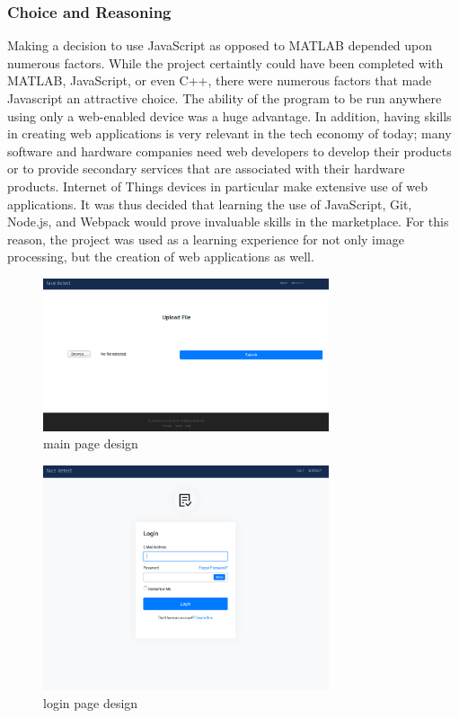 \documentclass{article}
\let\Oldsubsubsection\subsubsection
\renewcommand{\subsubsection}{\FloatBarrier\Oldsubsubsection}
\begin{document}
  \subsubsection{Choice and Reasoning}

  Making a decision to use JavaScript as opposed to MATLAB depended upon numerous factors. While the project certaintly could have been completed with MATLAB, JavaScript, or even C++, there were numerous factors that made Javascript an attractive choice. The ability of the program to be run anywhere using only a web-enabled device was a huge advantage. In addition, having skills in creating web applications is very relevant in the tech economy of today; many software and hardware companies need web developers to develop their products or to provide secondary services that are associated with their hardware products. Internet of Things devices in particular make extensive use of web applications. It was thus decided that learning the use of JavaScript, Git, Node.js, and Webpack would prove invaluable skills in the marketplace. For this reason, the project was used as a learning experience for not only image processing, but the creation of web applications as well.

  \begin{figure}[!htb]
    \centering
    \includegraphics[width=0.75\textwidth]{assets/main_page.png}
    \caption{main page design}
    \label{fig:main-page}
  \end{figure}

  \begin{figure}[!htb]
    \centering
    \includegraphics[width=0.75\textwidth]{assets/login.png}
    \caption{login page design}
    \label{fig:login-page}
  \end{figure}
\end{document}

